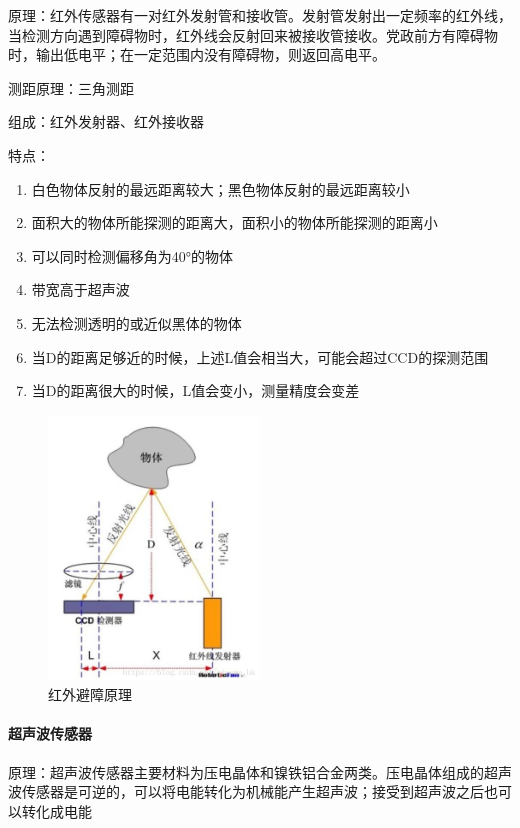\documentclass{report}
\begin{document}
原理：红外传感器有一对红外发射管和接收管。发射管发射出一定频率的红外线，当检测方向遇到障碍物时，红外线会反射回来被接收管接收。党政前方有障碍物时，输出低电平；在一定范围内没有障碍物，则返回高电平。

测距原理：三角测距

组成：红外发射器、红外接收器

特点：
\begin{enumerate}
\item 白色物体反射的最远距离较大；黑色物体反射的最远距离较小
\item 面积大的物体所能探测的距离大，面积小的物体所能探测的距离小
\item 可以同时检测偏移角为40°的物体
\item 带宽高于超声波
\item 无法检测透明的或近似黑体的物体
\item 当D的距离足够近的时候，上述L值会相当大，可能会超过CCD的探测范围
  \item 当D的距离很大的时候，L值会变小，测量精度会变差
  \end{enumerate}
  \begin{figure}[ht]
    \centering
    \includegraphics[width=0.5\textwidth]{figures/hongwaibizhang.png}
    \caption{红外避障原理 }
  \end{figure}

  \paragraph{超声波传感器}
  
原理：超声波传感器主要材料为压电晶体和镍铁铝合金两类。压电晶体组成的超声波传感器是可逆的，可以将电能转化为机械能产生超声波；接受到超声波之后也可以转化成电能
\end{document}
